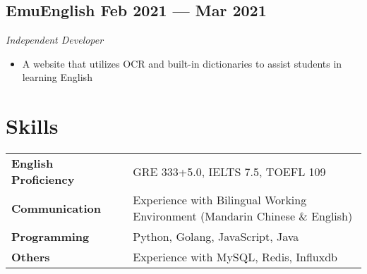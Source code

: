 \documentclass[a4,12pt]{article}
\newcommand{\subtext}[1]{
#1\par\vspace{-0.3cm}}
\newenvironment{zitemize}{
\begin{itemize}\itemsep0pt \parskip0pt \parsep1pt}
{\end{itemize}\vspace{-0.5cm}}
\newcommand{\hskills}[1]{
\textbf{\bfseries #1} }
\begin{document}
\subsection*{EmuEnglish \hfill \textbf{Feb 2021 --- Mar 2021}}
\subtext{\textit{Independent Developer}}
\begin{zitemize}
    \item A website that utilizes OCR and built-in dictionaries to assist students in learning English
\end{zitemize}


\section{\textbf{Skills}}
\begin{tabular}{p{11em} p{1em} p{43em}}
\hskills{English Proficiency} & & GRE 333+5.0, IELTS 7.5, TOEFL 109 \\
\hskills{Communication} & & Experience with Bilingual Working Environment (Mandarin Chinese \& English)  \\
\hskills{Programming} &  & Python, Golang, JavaScript, Java \\
\hskills{Others} & & Experience with MySQL, Redis, Influxdb
\end{tabular}
\vspace{-0.2cm}





\end{document}
